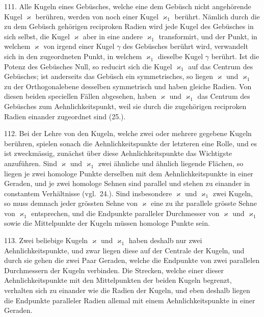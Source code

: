 111. Alle Kugeln eines Geb\"usches, welche eine dem
Geb\"usch nicht angeh\"orende Kugel $\varkappa$ ber\"uhren, werden von
noch einer Kugel $\varkappa_1$ ber\"uhrt. N\"amlich durch die zu dem
Geb\"usch geh\"origen reciproken Radien wird jede Kugel des
Geb\"usches in sich selbst, die Kugel $\varkappa$ aber in eine andere $\varkappa_1$
transformirt, und der Punkt, in welchem $\varkappa$ von irgend einer
Kugel $\gamma$ des Geb\"usches ber\"uhrt wird, verwandelt sich in den
zugeordneten Punkt, in welchem $\varkappa_1$ dieselbe Kugel $\gamma$ ber\"uhrt.
Ist die Potenz des Geb\"usches Null, so reducirt sich die
Kugel $\varkappa_1$ auf das Centrum des Geb\"usches; ist anderseits das
Geb\"usch ein symmetrisches, so liegen $\varkappa$ und $\varkappa_1$ zu der
Orthogonalebene desselben symmetrisch und haben gleiche Radien.
Von diesen beiden speciellen F\"allen abgesehen, haben
$\varkappa$ und $\varkappa_1$ das Centrum des Geb\"usches zum Aehnlichkeitspunkt,
weil sie durch die zugeh\"origen reciproken Radien einander
zugeordnet sind (25.).

112. Bei der Lehre von den Kugeln, welche zwei oder
mehrere gegebene Kugeln ber\"uhren, spielen sonach die Aehnlichkeitspunkte
der letzteren eine Rolle, und es ist zweckm\"assig,
zun\"achst \"uber diese Aehnlichkeitspunkte das Wichtigste
anzuf\"uhren. Sind $\varkappa$ und $\varkappa_1$ zwei \"ahnliche und \"ahnlich
liegende Fl\"achen, so liegen je zwei homologe Punkte derselben
mit dem Aehnlichkeitspunkte in einer Geraden, und
je zwei homologe Sehnen sind parallel und stehen zu einander
in constantem Verh\"altnisse (vgl.~24.). Sind insbesondere
$\varkappa$ und $\varkappa_1$ zwei Kugeln, so muss demnach jeder gr\"ossten
Sehne von $\varkappa$ eine zu ihr parallele gr\"osste Sehne von $\varkappa_1$ entsprechen,
und die Endpunkte paralleler Durchmesser von $\varkappa$
und $\varkappa_1$ sowie die Mittelpunkte der Kugeln m\"ussen homologe
Punkte sein.

113. Zwei beliebige Kugeln $\varkappa$ und $\varkappa_1$ haben deshalb
nur zwei Aehnlichkeitspunkte, und zwar liegen diese auf der
Centrale der Kugeln, und durch sie gehen die zwei Paar
Geraden, welche die Endpunkte von zwei parallelen Durchmessern
der Kugeln verbinden. Die Strecken, welche einer
dieser Aehnlichkeitspunkte mit den Mittelpunkten der beiden
Kugeln begrenzt, verhalten sich zu einander wie die Radien
der Kugeln, und eben deshalb liegen die Endpunkte paralleler
Radien allemal mit einem Aehnlichkeitspunkte in einer
Geraden.

